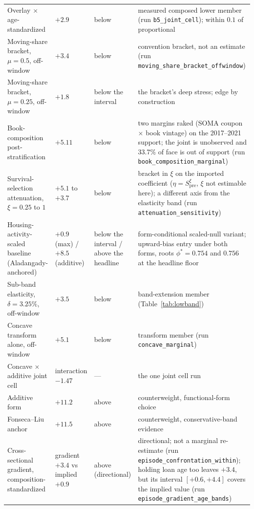 \begin{table}[!t]
\begin{tabular}{@{}p{3.1cm}p{2.6cm}p{2.4cm}p{7.7cm}@{}}
Overlay $\times$ age-standardized & $+2.9$ & below & measured composed lower member (run \texttt{b5\_joint\_cell}); within $0.1$ of proportional \\ Moving-share bracket, $\mu = 0.5$, off-window & $+3.4$ & below & convention bracket, not an estimate (run \texttt{moving\_share\_bracket\_offwindow}) \\ Moving-share bracket, $\mu = 0.25$, off-window & $+1.8$ & below the interval & the bracket's deep stress; edge by construction \\ Book-composition post-stratification & $+5.11$ & below & two margins raked (SOMA coupon $\times$ book vintage) on the 2017--2021 support; the joint is unobserved and 33.7\% of face is out of support (run \texttt{book\_composition\_marginal}) \\ Survival-selection attenuation, $\xi = 0.25$ to $1$ & $+5.1$ to $+3.7$ & below & bracket in $\xi$ on the imported coefficient ($\eta = S_{\mathrm{pre}}^{\xi}$, $\xi$ not estimable here); a different axis from the elasticity band (run \texttt{attenuation\_sensitivity}) \\ Housing-activity-scaled baseline (Aladangady-anchored) & $+0.9$ (max) / $+8.5$ (additive) & below the interval / above the headline & form-conditional scaled-null variant; upward-bias entry under both forms, roots $\phi^{*} = 0.754$ and $0.756$ at the headline floor \\ Sub-band elasticity, $\delta = 3.25\%$, off-window & $+3.5$ & below & band-extension member (Table~\ref{tab:lowband}) \\ Concave transform alone, off-window & $+5.1$ & below & transform member (run \texttt{concave\_marginal}) \\
Concave $\times$ additive joint cell & interaction $-1.47$ & --- & the one joint cell run \\
Additive form & $+11.2$ & above & counterweight, functional-form choice \\
Fonseca--Liu anchor & $+11.5$ & above & counterweight, conservative-band evidence \\ Cross-sectional gradient, composition-standardized & gradient $+3.4$ vs implied $+0.9$ & above (directional) & directional; not a marginal re-estimate (run \texttt{episode\_confrontation\_within}); holding loan age too leaves $+3.4$, but its interval $[+0.6, +4.4]$ covers the implied value (run \texttt{episode\_gradient\_age\_bands}) \\
\bottomrule
\end{tabular}
\end{table}

